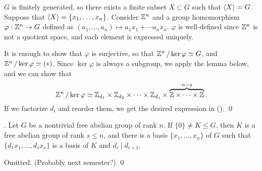 \pf {} \(G\) is finitely generated, so there exists a finite subset \(X \subset G\) such that \(\left\langle X \right\rangle = G\). Suppose that \(\left\langle X \right\rangle = \{x_1, \dots, x_n\}\). Consider \(\mathbb{Z}^n\) and a group homomorphism \(\varphi: \mathbb{Z}^n \rightarrow G\) defined as \((a_1, \dots, a_n) \mapsto a_1 x_1 + \cdots a_n x_n\). \(\varphi\) is well-defined since \(\mathbb{Z}^n\) is not a quotient space, and each element is expressed uniquely.

It is enough to show that \(\varphi\) is surjective, so that \(\mathbb{Z}^n \operatorname{/} \ker \varphi \simeq G\), and \(\mathbb{Z}^n \operatorname{/} \ker \varphi \simeq (\ast)\). Since \(\ker \varphi\) is always a subgroup, we apply the lemma below, and we can show that
\[
    \mathbb{Z}^n \operatorname{/} \ker\varphi \simeq \mathbb{Z}_{d_1} \times \mathbb{Z}_{d_2} \times \cdots \times \mathbb{Z}_{d_s} \times \overbrace{\mathbb{Z} \times \cdots \times \mathbb{Z}}^{n-s}.
\]
If we factorize \(d_i\) and reorder them, we get the desired expression in (\mast). \qed

\lemma. Let \(G\) be a nontrivial free abelian group of rank \(n\). If \(\{0\} \neq K \leq G\), then \(K\) is a free abelian group of rank \(s \leq n\), and there is a basis \(\{x_1, \dots, x_n\}\) of \(G\) such that \(\{d_1 x_1, \dots, d_s x_s\}\) is a basis of \(K\) and \(d_i \mid d_{i+1}\).

\pf Omitted. (Probably next semester?) \qed
\pagebreak
